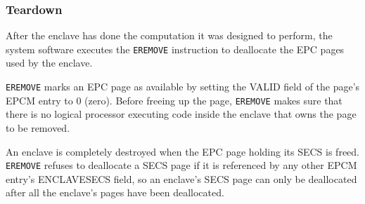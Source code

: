 \subsubsection{Teardown}
\label{sec:sgx_eremove}

After the enclave has done the computation it was designed to perform, the
system software executes the \texttt{EREMOVE} instruction to deallocate the
EPC pages used by the enclave.

\texttt{EREMOVE} marks an EPC page as available by setting the VALID field of
the page's EPCM entry to 0 (zero). Before freeing up the page, \texttt{EREMOVE}
makes sure that there is no logical processor executing code inside the enclave
that owns the page to be removed.

An enclave is completely destroyed when the EPC page holding its SECS is freed.
\texttt{EREMOVE} refuses to deallocate a SECS page if it is referenced by any
other EPCM entry's ENCLAVESECS field, so an enclave's SECS page can only be
deallocated after all the enclave's pages have been deallocated.

